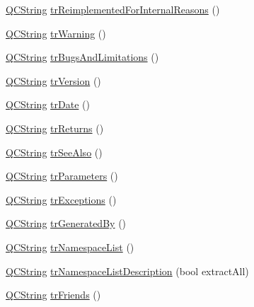 \begin{DoxyCompactItemize}
\item 
\mbox{\hyperlink{class_q_c_string}{Q\+C\+String}} \mbox{\hyperlink{class_translator_polish_a53c90cda5eeb567fafc0d620c9b30d03}{tr\+Reimplemented\+For\+Internal\+Reasons}} ()
\item 
\mbox{\hyperlink{class_q_c_string}{Q\+C\+String}} \mbox{\hyperlink{class_translator_polish_ac2c102476e3c367afb549e97883f5df1}{tr\+Warning}} ()
\item 
\mbox{\hyperlink{class_q_c_string}{Q\+C\+String}} \mbox{\hyperlink{class_translator_polish_ab7054cfc596a6882e0d8e1911ead33a7}{tr\+Bugs\+And\+Limitations}} ()
\item 
\mbox{\hyperlink{class_q_c_string}{Q\+C\+String}} \mbox{\hyperlink{class_translator_polish_a50ad2c9bf96d94a8a21a464b81a4ab3c}{tr\+Version}} ()
\item 
\mbox{\hyperlink{class_q_c_string}{Q\+C\+String}} \mbox{\hyperlink{class_translator_polish_a3e7bf0ac2c5231a890e4f4ad557834d0}{tr\+Date}} ()
\item 
\mbox{\hyperlink{class_q_c_string}{Q\+C\+String}} \mbox{\hyperlink{class_translator_polish_a2afd1448fafe6413751b7edc5086e24d}{tr\+Returns}} ()
\item 
\mbox{\hyperlink{class_q_c_string}{Q\+C\+String}} \mbox{\hyperlink{class_translator_polish_a1723e67cd770fb5becba21fb81a7e6f0}{tr\+See\+Also}} ()
\item 
\mbox{\hyperlink{class_q_c_string}{Q\+C\+String}} \mbox{\hyperlink{class_translator_polish_a0ddbafd02dba272771f9e332c74d5053}{tr\+Parameters}} ()
\item 
\mbox{\hyperlink{class_q_c_string}{Q\+C\+String}} \mbox{\hyperlink{class_translator_polish_a3aa24750d30c7cb91e001aa2a45d409a}{tr\+Exceptions}} ()
\item 
\mbox{\hyperlink{class_q_c_string}{Q\+C\+String}} \mbox{\hyperlink{class_translator_polish_aeb244cad8c4c8b6bd1e991a4a5507852}{tr\+Generated\+By}} ()
\item 
\mbox{\hyperlink{class_q_c_string}{Q\+C\+String}} \mbox{\hyperlink{class_translator_polish_a5a4beabb336dbbb60ca4673bcac08b7f}{tr\+Namespace\+List}} ()
\item 
\mbox{\hyperlink{class_q_c_string}{Q\+C\+String}} \mbox{\hyperlink{class_translator_polish_a3a8f74b8c29e0b30a9141b8c429745c3}{tr\+Namespace\+List\+Description}} (bool extract\+All)
\item 
\mbox{\hyperlink{class_q_c_string}{Q\+C\+String}} \mbox{\hyperlink{class_translator_polish_a61ee64087632405298cd2fd92615baa7}{tr\+Friends}} ()
\item 

\end{DoxyCompactItemize}
